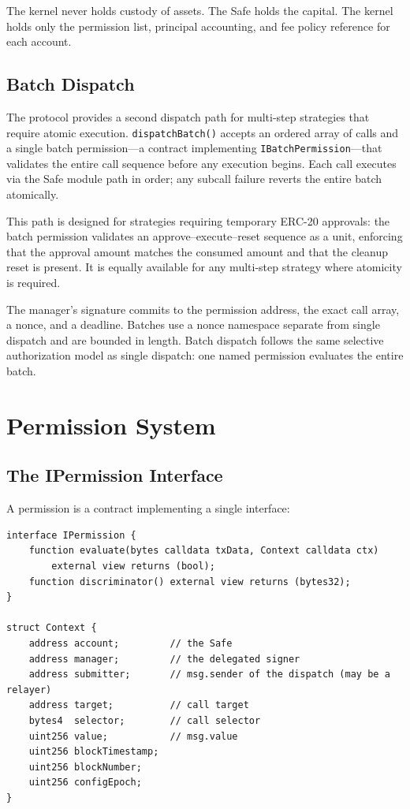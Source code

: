\documentclass[11pt]{article}
\newcommand{\Needspace}[1]{}
\begin{document}
The kernel never holds custody of assets. The Safe holds the capital. The kernel holds only the permission list, principal accounting, and fee policy reference for each account.

\subsection{Batch Dispatch}

The protocol provides a second dispatch path for multi-step strategies that require atomic execution. \texttt{dispatchBatch()} accepts an ordered array of calls and a single batch permission---a contract implementing \texttt{IBatchPermission}---that validates the entire call sequence before any execution begins. Each call executes via the Safe module path in order; any subcall failure reverts the entire batch atomically.

This path is designed for strategies requiring temporary ERC-20 approvals: the batch permission validates an approve--execute--reset sequence as a unit, enforcing that the approval amount matches the consumed amount and that the cleanup reset is present. It is equally available for any multi-step strategy where atomicity is required.

\Needspace{5\baselineskip}
The manager's signature commits to the permission address, the exact call array, a nonce, and a deadline. Batches use a nonce namespace separate from single dispatch and are bounded in length. Batch dispatch follows the same selective authorization model as single dispatch: one named permission evaluates the entire batch.


\section{Permission System}

\subsection{The IPermission Interface}

A permission is a contract implementing a single interface:

\begin{lstlisting}
interface IPermission {
    function evaluate(bytes calldata txData, Context calldata ctx)
        external view returns (bool);
    function discriminator() external view returns (bytes32);
}

struct Context {
    address account;         // the Safe
    address manager;         // the delegated signer
    address submitter;       // msg.sender of the dispatch (may be a relayer)
    address target;          // call target
    bytes4  selector;        // call selector
    uint256 value;           // msg.value
    uint256 blockTimestamp;
    uint256 blockNumber;
    uint256 configEpoch;
}
\end{lstlisting}
\end{document}
